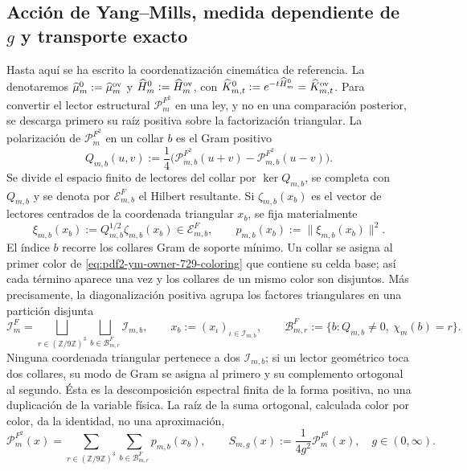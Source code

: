 \subsection{Acción de Yang--Mills, medida dependiente de $g$ y transporte exacto}

Hasta aquí se ha escrito la coordenatización cinemática de referencia. La denotaremos
$\widehat\mu_m^0:=\widehat\mu_m^{\rm ov}$ y
$\widehat H_m^0:=\widehat H_m^{\rm ov}$, con
$\widehat K_{m,t}^0:=e^{-t\widehat H_m^0}=\widehat K_{m,t}^{\rm ov}$.
Para convertir el lector estructural
$\mathcal P_m^{F^2}$ en una ley, y no en una comparación posterior, se descarga
primero su raíz positiva sobre la factorización triangular. La polarización de
$\mathcal P_m^{F^2}$ en un collar $b$ es el Gram positivo
\[
 Q_{m,b}(u,v):=\frac14\bigl(
 \mathcal P_{m,b}^{F^2}(u+v)-\mathcal P_{m,b}^{F^2}(u-v)
 \bigr).
\]
Se divide el espacio finito de lectores del collar por $\ker Q_{m,b}$, se completa
con $Q_{m,b}$ y se denota por $\mathcal E_{m,b}^{F}$ el Hilbert resultante. Si
$\zeta_{m,b}(x_b)$ es el vector de lectores centrados de la coordenada triangular
$x_b$, se fija materialmente
\begin{equation}\label{eq:pdf2-ym-action-root}
 \xi_{m,b}(x_b):=Q_{m,b}^{1/2}\zeta_{m,b}(x_b)
 \in\mathcal E_{m,b}^{F},
 \qquad
 p_{m,b}(x_b):=\|\xi_{m,b}(x_b)\|^2.
\end{equation}
El índice $b$ recorre los collares Gram de soporte mínimo. Un collar se asigna
al primer color de \eqref{eq:pdf2-ym-owner-729-coloring} que contiene su celda base;
así cada término aparece una vez y los collares de un mismo color son disjuntos.
Más precisamente, la diagonalización positiva agrupa los factores triangulares en
una partición disjunta
\begin{equation}\label{eq:pdf2-ym-action-factor-partition}
 \mathcal I_m^{F}
 =\bigsqcup_{r\in(\mathbb Z/9\mathbb Z)^3}
   \bigsqcup_{b\in\mathcal B_{m,r}^{F}}\mathcal I_{m,b},
 \qquad x_b:=(x_\iota)_{\iota\in\mathcal I_{m,b}},
 \qquad
 \mathcal B_{m,r}^{F}:=\{b:Q_{m,b}\ne0,\ \chi_m(b)=r\}.
\end{equation}
Ninguna coordenada triangular pertenece a dos $\mathcal I_{m,b}$; si un lector
geométrico toca dos collares, su modo de Gram se asigna al primero y su complemento
ortogonal al segundo. Ésta es la descomposición espectral finita de la forma positiva,
no una duplicación de la variable física.
La raíz de la suma ortogonal, calculada color por color, da la identidad, no una
aproximación,
\begin{equation}\label{eq:pdf2-ym-action-reader-sum}
 \mathcal P_m^{F^2}(x)
 =\sum_{r\in(\mathbb Z/9\mathbb Z)^3}
   \sum_{b\in\mathcal B_{m,r}^{F}}p_{m,b}(x_b),
 \qquad
 S_{m,g}(x):=\frac1{4g^2}\mathcal P_m^{F^2}(x),
 \quad g\in(0,\infty).
\end{equation}

